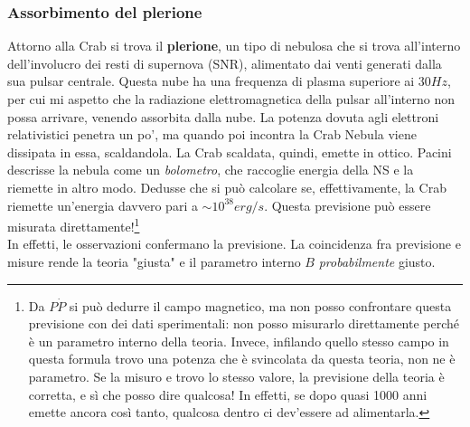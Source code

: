 \subsubsection{Assorbimento del plerione}
Attorno alla Crab si trova il \textbf{plerione}, un tipo di nebulosa che si trova all'interno dell'involucro dei resti di supernova (SNR), alimentato dai venti generati dalla sua pulsar centrale. 
Questa nube ha una frequenza di plasma superiore ai $30Hz$, per cui mi aspetto che la radiazione elettromagnetica della pulsar all'interno non possa arrivare, venendo assorbita dalla nube.
La potenza dovuta agli elettroni relativistici penetra un po', ma quando poi incontra la Crab Nebula viene dissipata in essa, scaldandola.
La Crab scaldata, quindi, emette in ottico.
Pacini descrisse la nebula come un \textit{bolometro}, che raccoglie energia della NS e la riemette in altro modo. 
Dedusse che si può calcolare se, effettivamente, la Crab riemette un'energia davvero pari a $\sim10^{38}erg/s$.
Questa previsione può essere misurata direttamente!\footnote{Da $P\dot{P}$ si può dedurre il campo magnetico, ma non posso confrontare questa previsione con dei dati sperimentali: non posso misurarlo direttamente perché è un parametro interno della teoria.
Invece, infilando quello stesso campo in questa formula trovo una potenza che è svincolata da questa teoria, non ne è parametro.
Se la misuro e trovo lo stesso valore, la previsione della teoria è corretta, e sì che posso dire qualcosa!
In effetti, se dopo quasi 1000 anni emette ancora così tanto, qualcosa dentro ci dev'essere ad alimentarla.}\\
In effetti, le osservazioni confermano la previsione.
La coincidenza fra previsione e misure rende la teoria "giusta" e il parametro interno $B$ \textit{probabilmente} giusto.

